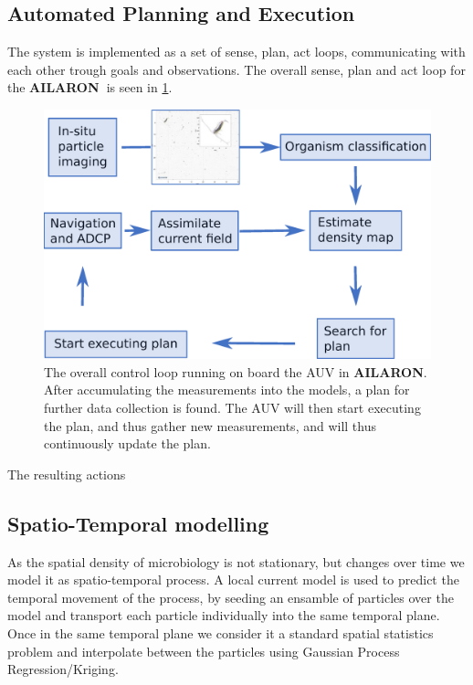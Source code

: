 \documentclass[conference]{IEEEtran}
\def\proj{{\textbf{AILARON\ }}}
\def\proje{{\textbf{AILARON}}}
\newcommand{\cmt}[1]{{\color{red}{#1}}}
\begin{document}
\subsection{Automated Planning and Execution}

The system is implemented as a set of sense, plan, act loops, communicating with each other trough goals and observations. \cite{rajan12}
The overall sense, plan and act loop for the \proj is seen in \cref{fig:sensePlanActLoop}. 
\begin{figure}[tbp]
\centerline{\includegraphics[width=0.9\linewidth]{figures/workflow-simplified.eps}}
\caption{The overall control loop running on board the AUV in \proje. After accumulating the measurements into the models, a plan for further data collection is found. The AUV will then start executing the plan, and thus gather new measurements, and will thus continuously update the plan.}
\label{fig:sensePlanActLoop}
\end{figure}
The resulting actions 



\subsection{Spatio-Temporal modelling}

As the spatial density of microbiology is not stationary, but changes over time we model it as spatio-temporal process. 
A local current model is used to predict the temporal movement of the process, by seeding an ensamble of particles over the model and transport each particle individually into the same temporal plane.
Once in the same temporal plane we consider it a standard spatial statistics problem and interpolate between the particles using Gaussian Process Regression/Kriging.
\end{document}
